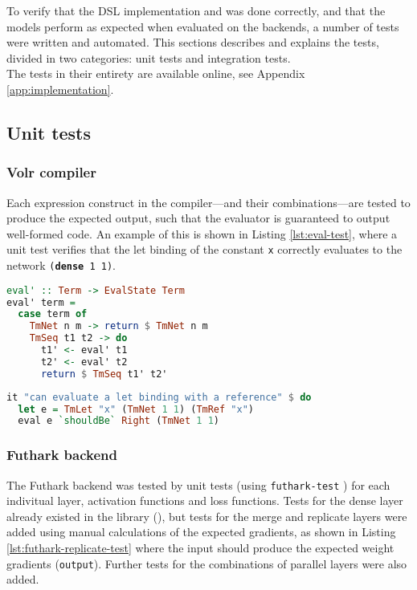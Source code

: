 To verify that the DSL implementation and was done
correctly, and that the models perform as expected when evaluated on the
backends, a number of tests were written and automated.
This sections describes and explains the tests, divided in two categories: unit
tests and integration tests.
\\[0.2cm]
The tests in their entirety are available online, see Appendix \ref{app:implementation}.

\subsection{Unit tests}
\subsubsection{Volr compiler}
Each expression construct in the compiler---and their combinations---are
tested to produce the expected output, such that the evaluator
is guaranteed to output well-formed code.
An example of this is shown in Listing \ref{lst:eval-test},
where a unit test  verifies that the let
binding of the constant \texttt{x} correctly
evaluates to the network \texttt{(\textbf{dense} 1 1)}.

\begin{minipage}{\linewidth}
\begin{lstlisting}[language=haskell,caption={Part of the evaluation code in
Haskell.},label={code:evaluator}]
eval' :: Term -> EvalState Term
eval' term =
  case term of
    TmNet n m -> return $ TmNet n m
    TmSeq t1 t2 -> do
      t1' <- eval' t1 
      t2' <- eval' t2
      return $ TmSeq t1' t2'
\end{lstlisting}
\end{minipage}

\begin{lstlisting}[language=Haskell,label={lst:eval-test},caption={A unit test for the correct evaluation of a let binding.}]
it "can evaluate a let binding with a reference" $ do
  let e = TmLet "x" (TmNet 1 1) (TmRef "x")
  eval e `shouldBe` Right (TmNet 1 1)
\end{lstlisting} 

\subsubsection{Futhark backend}
The Futhark backend was tested by unit tests (using \texttt{futhark-test}
\cite{Elsman2018}) for each indivitual layer, activation functions and loss functions.
Tests for the dense layer already existed in the library (\cite{Minh2018}), but tests for the merge and
replicate layers were added using manual calculations of the expected gradients, as shown in Listing
\ref{lst:futhark-replicate-test} where the input should produce the expected weight
gradients (\texttt{output}).
Further tests for the combinations of parallel layers were also added.

